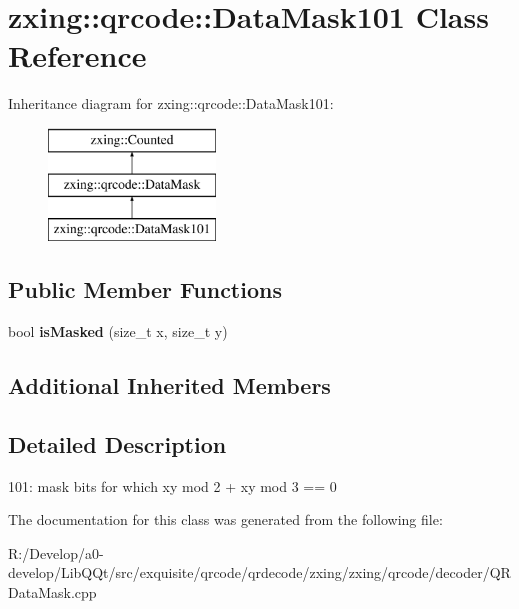 \hypertarget{classzxing_1_1qrcode_1_1_data_mask101}{}\section{zxing\+:\+:qrcode\+:\+:Data\+Mask101 Class Reference}
\label{classzxing_1_1qrcode_1_1_data_mask101}
Inheritance diagram for zxing\+:\+:qrcode\+:\+:Data\+Mask101\+:\begin{figure}[H]
\begin{center}
\leavevmode
\includegraphics[height=3.000000cm]{classzxing_1_1qrcode_1_1_data_mask101}
\end{center}
\end{figure}
\subsection*{Public Member Functions}
\begin{DoxyCompactItemize}
\item 
\mbox{\label{classzxing_1_1qrcode_1_1_data_mask101_a0106f3b117b0aa8daf2d2af49f0afa18}} 
bool {\bfseries is\+Masked} (size\+\_\+t x, size\+\_\+t y)
\end{DoxyCompactItemize}
\subsection*{Additional Inherited Members}


\subsection{Detailed Description}
101\+: mask bits for which xy mod 2 + xy mod 3 == 0 

The documentation for this class was generated from the following file\+:\begin{DoxyCompactItemize}
\item 
R\+:/\+Develop/a0-\/develop/\+Lib\+Q\+Qt/src/exquisite/qrcode/qrdecode/zxing/zxing/qrcode/decoder/Q\+R\+Data\+Mask.\+cpp\end{DoxyCompactItemize}
